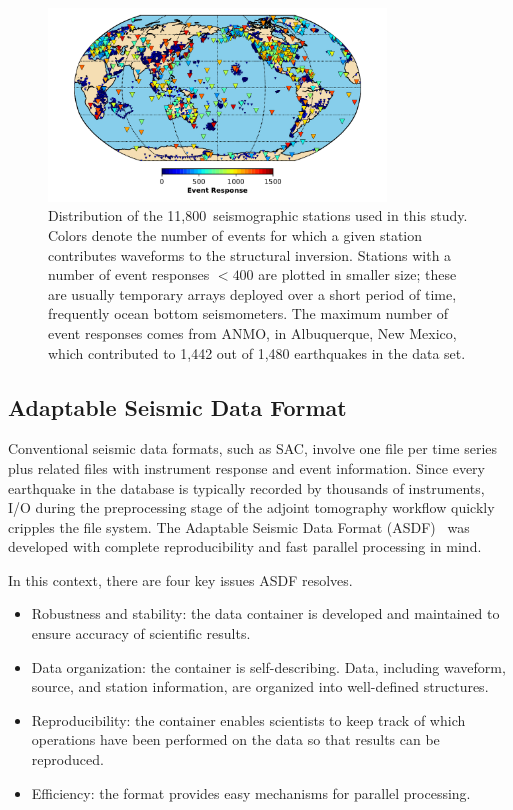 \documentclass[extra,mreferee]{gji}
\begin{document}
\begin{figure}
  \includegraphics[width=0.8\textwidth]{figures/station_map.pdf}
  \caption{Distribution of the 11,800~seismographic stations used in this study. Colors denote the number of events for which a given station contributes waveforms to the structural inversion. Stations with a number of event responses $<400$ are plotted in smaller size; these are usually temporary arrays deployed over a short period of time, frequently ocean bottom seismometers. The maximum number of event responses comes from ANMO, in Albuquerque, New Mexico, which contributed to 1,442 out of 1,480 earthquakes in the data set.}
  \label{fig:stations}
  \centering
\end{figure}

\subsection{Adaptable Seismic Data Format}
\label{section:ASDF}

Conventional seismic data formats, such as SAC, involve one file per time series
plus related files with instrument response and event information.
Since every earthquake in the database is typically recorded by thousands of
instruments, I/O during the preprocessing stage of the adjoint tomography workflow
quickly cripples the file system. The Adaptable Seismic Data Format
(ASDF)~\citep[][ \texttt{https://seismic-data.org/ }]{krischer2016adaptable}
was developed with complete reproducibility and fast parallel processing in mind.

In this context, there are four key issues ASDF resolves.
\begin{itemize}
    \item Robustness and stability: the data container is developed and maintained to ensure accuracy of scientific results.
    \item Data organization: the container is self-describing. Data, including waveform, source, and station information, are organized into well-defined structures.
    \item Reproducibility: the container enables scientists to keep track of which operations have been performed on the data so that results can be reproduced.
    \item Efficiency: the format provides easy mechanisms for parallel processing.
\end{itemize}
\end{document}

